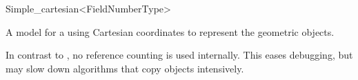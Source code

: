 \begin{ccRefClass}{Simple_cartesian<FieldNumberType>}

\ccDefinition
A model for a  using Cartesian coordinates to represent the
geometric objects. 

\ccIsModel
{}

\ccTypes
{}
\ccGlue
{}

\ccImplementation In contrast to , no reference counting
is used internally. This eases debugging, but may slow down algorithms
that copy objects intensively.

\ccSeeAlso
{} \\
 \\
 \\

\end{ccRefClass}
